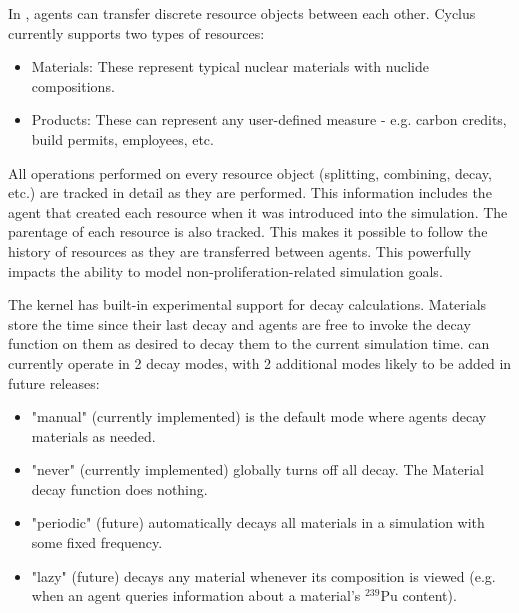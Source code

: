 
In \Cyclus, agents can transfer discrete resource objects between each other.
Cyclus currently supports two types of resources:

\begin{itemize}

  \item Materials: These represent typical nuclear materials with
      nuclide compositions.

  \item Products: These can represent any user-defined measure - e.g. carbon
      credits, build permits, employees, etc.

\end{itemize}

All operations performed on every resource object (splitting, combining,
decay, etc.) are tracked in detail as they are performed.  This information
includes the agent that created each resource when it was introduced into the
simulation.  The parentage of each resource is also tracked. This makes it
possible to follow the history of resources as they are transferred between
agents.  This powerfully impacts the ability to model
non-proliferation-related simulation goals. 

The \Cyclus kernel has built-in experimental support for decay calculations.
Materials store the time since their last decay and agents are free to
invoke the decay function on them as desired to decay them to the current
simulation time. \Cyclus can currently operate in 2 decay modes, with 2 additional
modes likely to be added in future releases:

\begin{itemize}

    \item "manual" (currently implemented) is the default mode 
        where agents decay materials as needed.

    \item "never" (currently implemented) globally turns off all decay.
        The Material decay function does nothing.

    \item "periodic" (future) automatically decays all materials in a
        simulation with some fixed frequency.

    \item "lazy" (future) decays any material whenever its composition is
        viewed (e.g. when an agent queries information about a material's
        $^{239}$Pu content).

\end{itemize}

